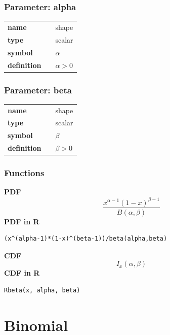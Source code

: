 \subsubsection*{Parameter: alpha}

\noindent\begin{tabular}{p{2cm}cl}
\textbf{name} & & shape \\
\textbf{type} & & scalar \\
\textbf{symbol} & & $\alpha$  \\
\textbf{definition} & & $\alpha > 0$
\end{tabular}
\subsubsection*{Parameter: beta}

\noindent\begin{tabular}{p{2cm}cl}
\textbf{name} & & shape \\
\textbf{type} & & scalar \\
\textbf{symbol} & & $\beta$  \\
\textbf{definition} & & $\beta > 0$
\end{tabular}
\subsubsection*{Functions}

\smallskip \noindent \hspace{.2cm} \textbf{PDF} 
\begin{equation*}\frac{x^{\alpha-1}(1-x)^{\beta-1}} {B(\alpha,\beta)} \end{equation*}
\smallskip \noindent \hspace{.2cm} \textbf{PDF in R}  
\begin{verbatim}
(x^(alpha-1)*(1-x)^(beta-1))/beta(alpha,beta)
\end{verbatim}

\smallskip \noindent \hspace{.2cm} \textbf{CDF} 
\begin{equation*}I_x(\alpha,\beta)\end{equation*}
\smallskip \noindent \hspace{.2cm} \textbf{CDF in R} 
\begin{verbatim}Rbeta(x, alpha, beta)\end{verbatim}
\smallskip\section*{Binomial} 

